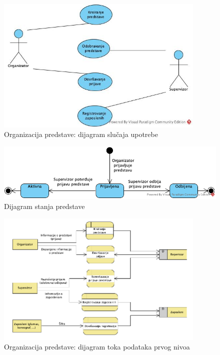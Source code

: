 \documentclass[a4paper]{article}
\begin{document}
\begin{figure}[H]
  \begin{center}
      \includegraphics[width=100mm]{../images/usecase_organizacija_predstave.jpg}
  \end{center}
  \caption{Organizacija predstave: dijagram slučaja upotrebe}
  \label{usecase_organizacija_predstave}
\end{figure}

\begin{figure}[H]
  \begin{center}
      \includegraphics[width=120mm]{../images/state_predstava.png}
  \end{center}
  \caption{Dijagram stanja predstave}
  \label{state_predstava}
\end{figure}

\begin{figure}[H]
  \begin{center}
      \includegraphics[width=100mm]{../images/dfd2_organizacija_predstave.png}
  \end{center}
  \caption{Organizacija predstave: dijagram toka podataka prvog nivoa}
  \label{dfd2_organizacija_predstave}
\end{figure}
\end{document}
